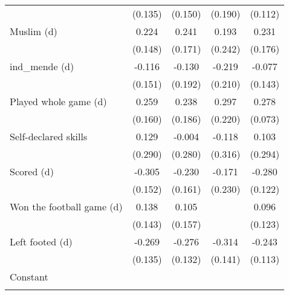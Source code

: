 {\begin{tabular}{l*{4}{c}}
                    &     (0.135)         &     (0.150)         &     (0.190)         &     (0.112)         \\
[1em]
Muslim (d)          &       0.224         &       0.241         &       0.193         &       0.231         \\
                    &     (0.148)         &     (0.171)         &     (0.242)         &     (0.176)         \\
[1em]
ind\_mende (d)       &      -0.116         &      -0.130         &      -0.219         &      -0.077         \\
                    &     (0.151)         &     (0.192)         &     (0.210)         &     (0.143)         \\
[1em]
Played whole game (d)&       0.259         &       0.238         &       0.297         &       0.278\sym{***}\\
                    &     (0.160)         &     (0.186)         &     (0.220)         &     (0.073)         \\
[1em]
Self-declared skills&       0.129         &      -0.004         &      -0.118         &       0.103         \\
                    &     (0.290)         &     (0.280)         &     (0.316)         &     (0.294)         \\
[1em]
Scored (d)          &      -0.305\sym{**} &      -0.230         &      -0.171         &      -0.280\sym{**} \\
                    &     (0.152)         &     (0.161)         &     (0.230)         &     (0.122)         \\
[1em]
Won the football game (d)&       0.138         &       0.105         &                     &       0.096         \\
                    &     (0.143)         &     (0.157)         &                     &     (0.123)         \\
[1em]
Left footed (d)     &      -0.269\sym{**} &      -0.276\sym{**} &      -0.314\sym{**} &      -0.243\sym{**} \\
                    &     (0.135)         &     (0.132)         &     (0.141)         &     (0.113)         \\
[1em]
Constant            &                     &                     &                     &                     \\
                    &                     &                     &                     &                     \\

\end{tabular}}
